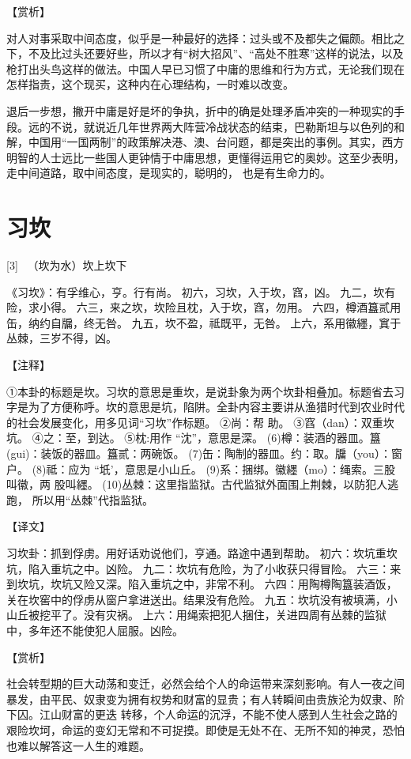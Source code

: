 \documentclass[12pt,UTF8]{ctexbook}
\begin{document}
【赏析】

对人对事采取中间态度，似乎是一种最好的选择：过头或不及都失之偏颇。相比之下，不及比过头还要好些，所以才有“树大招风”、“高处不胜寒”这样的说法，以及枪打出头鸟这样的做法。中国人早已习惯了中庸的思维和行为方式，无论我们现在怎样指责，这个现买，这种内在心理结构，一时难以改变。

退后一步想，撇开中庸是好是坏的争执，折中的确是处理矛盾冲突的一种现实的手段。远的不说，就说近几年世界两大阵营冷战状态的结束，巴勒斯坦与以色列的和解，中国用“一国两制”的政策解决港、澳、台问题，都是突出的事例。其实，西方明智的人士远比一些国人更钟情于中庸思想，更懂得运用它的奥妙。这至少表明，走中间道路，取中间态度，是现实的，聪明的， 也是有生命力的。

\chapter{习坎}

[3] \ （坎为水）坎上坎下

《习坎》：有孚维心，亨。行有尚。
初六，习坎，入于坎，窞，凶。
九二，坎有险，求小得。
六三，来之坎，坎险且枕，入于坎，窞，勿用。
六四，樽酒簋贰用缶，纳约自牖，终无咎。
九五，坎不盈，祗既平，无咎。
上六，系用徽纆，窴于丛棘，三岁不得，凶。

【注释】

①本卦的标题是坎。习坎的意思是重坎，是说卦象为两个坎卦相叠加。标题省去习字是为了方便称呼。坎的意思是坑，陷阱。全卦内容主要讲从渔猎时代到农业时代的社会发展变化，用多见词“习坎”作标题。
②尚：帮 助。
③窞（dan）：双重坎坑。
④之：至，到达。
⑤枕:用作 “沈”，意思是深。
(6)樽：装酒的器皿。簋(gui)：装饭的器皿。簋贰：两碗饭。
(7)缶：陶制的器皿。约：取。牖（you）：窗户。
(8)祗：应为 “坁’，意思是小山丘。
(9)系：捆绑。徽纆（mo）：绳索。三股叫徽，两 股叫纆。
(10)丛棘：这里指监狱。古代监狱外面围上荆棘，以防犯人逃跑， 所以用“丛棘”代指监狱。

【译文】

习坎卦：抓到俘虏。用好话劝说他们，亨通。路途中遇到帮助。
初六：坎坑重坎坑，陷入重坑之中。凶险。
九二：坎坑有危险，为了小收获只得冒险。
六三：来到坎坑，坎坑又险又深。陷入重坑之中，非常不利。
六四：用陶樽陶簋装酒饭，关在坎窖中的俘虏从窗户拿进送出。结果没有危险。
九五：坎坑没有被填满，小山丘被挖平了。没有灾祸。
上六：用绳索把犯人捆住，关进四周有丛棘的监狱中，多年还不能使犯人屈服。凶险。

【赏析】

社会转型期的巨大动荡和变迁，必然会给个人的命运带来深刻影响。有人一夜之间暴发，由平民、奴隶变为拥有权势和财富的显贵；有人转瞬间由贵族沦为奴隶、阶下囚。江山财富的更迭 转移，个人命运的沉浮，不能不使人感到人生社会之路的艰险坎坷，命运的变幻无常和不可捉摸。即使是无处不在、无所不知的神灵，恐怕也难以解答这一人生的难题。
\end{document}
